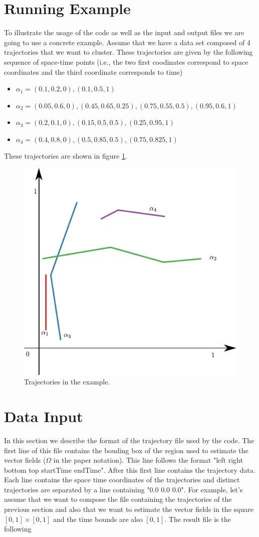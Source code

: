 \documentclass[10pt]{article}
\begin{document}
\section{Running Example}
To illustrate the usage of the code as well as the input and output files we are going to use a concrete example.
Assume that we have a data set composed of 4 trajectories that we want to cluster. These trajectories are given by
the following sequence of space-time points (i.e., the two first coodinates correspond to space coordinates and 
the third coordinate corresponds to time)

\begin{itemize}
\item $\alpha_1 = (0.1,0.2,0) , (0.1,0.5,1)$
\item $\alpha_2 = (0.05,0.6,0) , ( 0.45 , 0.65 , 0.25 ) , ( 0.75 , 0.55 , 0.5 ) , ( 0.95 , 0.6 , 1 )$
\item $\alpha_3 = (0.2,0.1,0) , (0.15,0.5,0.5), (0.25,0.95,1)$
\item $\alpha_4 = (0.4,0.8,0) , (0.5,0.85,0.5), (0.75,0.825,1)$
\end{itemize}

These trajectories are shown in figure \ref{figs:first_example}.

\begin{figure}
\centerline{\includegraphics[width=0.5\linewidth]{figs/first_example.pdf}}
\caption{Trajectories in the example.}
\label{figs:first_example}
\end{figure}

\section{Data Input}\label{sec:file_format}
In this section we describe the format of the trajectory file used by the code.
The first line of this file contains the bouding box of the region used to estimate
the vector fields ($\Omega$ in the paper notation). This line follows the format "left right bottom top startTime endTime". After this first line contains the trajectory data. Each line
contains the space time coordinates of the trajectories and distinct trajectories are separated
by a line containing "0.0 0.0 0.0". For example, let's assume that we want to compose the file
containing the trajectories of the previous section and also that we want to estimate
the vector fields in the square $[0,1]\times [0,1]$ and the time bounds are also $[0,1]$.
The result file is the following
\end{document}
